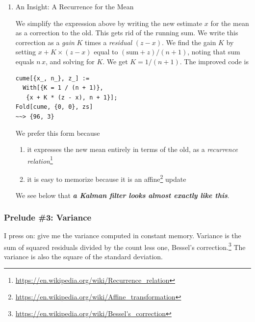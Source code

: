 \documentclass[10pt,oneside,x11names]{article}
\begin{document}
\begin{enumerate}
\item An Insight: A Recurrence for the Mean
\label{sec:orgheadline5}

We simplify the expression above by writing the new estimate \(x\) for the mean as
a correction to the old. This gets rid of the running sum. We write this
correction as a \emph{gain} \(K\) times a \emph{residual} \((z-x)\). We find the gain \(K\) by
setting \(x+K\times(z-x)\) equal to \((\textrm{sum}+z)/(n+1)\), noting that sum
equals \(n\,x\), and solving for \(K\). We get \(K=1/(n+1)\). The improved code is

\begin{verbatim}
cume[{x_, n_}, z_] :=
  With[{K = 1 / (n + 1)},
   {x + K * (z - x), n + 1}];
Fold[cume, {0, 0}, zs]
~~> {96, 3}
\end{verbatim}

We prefer this form because
\begin{enumerate}
\item it expresses the new mean entirely in terms of the old, as a \emph{recurrence
relation}\footnote{\url{https://en.wikipedia.org/wiki/Recurrence_relation}}
\item it is easy to memorize because it is an affine\footnote{\url{https://en.wikipedia.org/wiki/Affine_transformation}} update
\end{enumerate}

We see below that
\textbf{\emph{a Kalman filter looks almost exactly like this}}.
\end{enumerate}

\subsubsection{Prelude \#3: Variance}
\label{sec:orgheadline12}

I press on: give me the variance computed in constant memory. Variance is the
sum of squared residuals divided by the count less one, Bessel's
correction.\footnote{\url{https://en.wikipedia.org/wiki/Bessel's_correction}} The variance is also the square of the standard deviation.
\end{document}
